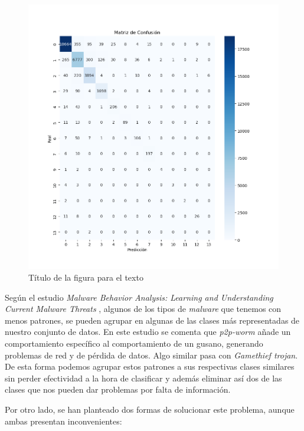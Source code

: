 \begin{figure}[H]
	\centering
	\includegraphics[width=1.2\linewidth]{Imagenes/confusion_multiclase}
	\caption[Titulo de la figura para el índice de figuras. En este no se deben poner referencias a citas]{Título de la figura para el texto}
	\label{fig:confusion}
\end{figure}

Según el estudio \textit{Malware Behavior Analysis: Learning and Understanding Current Malware Threats} \cite{mba}, algunos de los tipos de \textit{malware} que tenemos con menos patrones, se pueden agrupar en algunas de las clases más representadas de nuestro conjunto de datos. En este estudio se comenta que \textit{p2p-worm} añade un comportamiento específico al comportamiento de un gusano, generando problemas de red y de pérdida de datos. Algo similar pasa con \textit{Gamethief trojan}. De esta forma podemos agrupar estos patrones a sus respectivas clases similares sin perder efectividad a la hora de clasificar y además eliminar así dos de las clases que nos pueden dar problemas por falta de información.

\vspace{1em}

Por otro lado, se han planteado dos formas de solucionar este problema, aunque ambas presentan inconvenientes:

